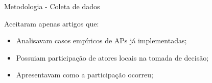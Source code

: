 \begin{frame}{Metodologia - Coleta de dados}

Aceitaram apenas artigos que:
\vspace{0.5em}

\begin{itemize}
    \item Analisavam casos empíricos de APs já implementadas;
    \item Possuiam participação de atores locais na tomada de decisão;
    \item Apresentavam como a participação ocorreu;
\end{itemize}
\end{frame}